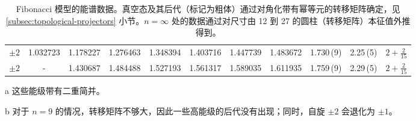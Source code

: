 \begin{table}
\begin{threeparttable}
\begin{tabular}{*{11}{c}}
         $\pm2$      &  1.032723\tnote{b}  &  1.178227  &  1.276463  &  1.348394  &  1.403716  &  1.447739  &  1.483672  &  1.730\,(9)   &  2.25\,(5)    &  $2{+}\frac{2}{15}$       \\
         $\pm2$      &  -\tnote{b}         &  1.430687  &  1.484488  &  1.527193  &  1.561317  &  1.589035  &  1.611935  &  1.759\,(9)   &  2.29\,(5)    &  $2{+}\frac{2}{15}$       \\
      \bottomrule
    \end{tabular}
    \begin{tablenotes}
      \item[a] 这些能级带有二重简并。
      \item[b] 对于 $n=9$ 的情况，转移矩阵不够大，因此一些高能级的后代没有出现；同时，自旋 $\pm2$ 会退化为 $\pm1$。
    \end{tablenotes}
    \caption[Fibonacci 模型的能谱数据]{Fibonacci 模型的能谱数据。真空态及其后代（标记为粗体）通过对角化带有幂等元的转移矩阵确定，见 \ref{subsec:topological-projectors} 小节。$n=\infty$ 处的数据通过对尺寸由 12 到 27 的圆柱（转移矩阵）本征值外推得到。}
    \label{tab:fib-spectrum}
  \end{threeparttable}
\end{table}
